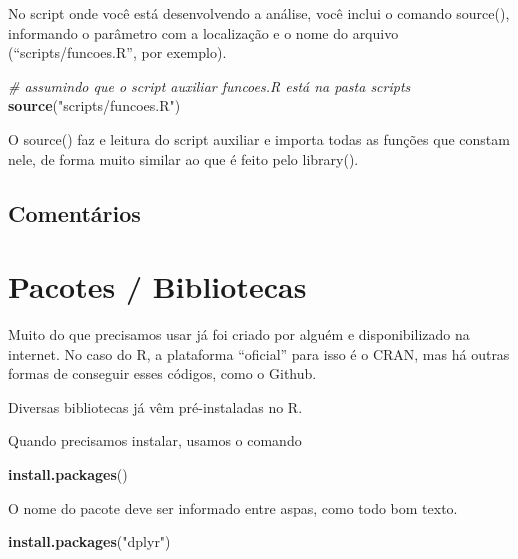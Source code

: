 \documentclass[
]{book}
\newenvironment{Shaded}{\begin{snugshade}}{\end{snugshade}}
\newcommand{\CommentTok}[1]{\textcolor[rgb]{0.56,0.35,0.01}{\textit{#1}}}
\newcommand{\KeywordTok}[1]{\textcolor[rgb]{0.13,0.29,0.53}{\textbf{#1}}}
\newcommand{\NormalTok}[1]{#1}
\newcommand{\StringTok}[1]{\textcolor[rgb]{0.31,0.60,0.02}{#1}}
\begin{document}
No script onde você está desenvolvendo a análise, você inclui o comando source(), informando o parâmetro com a localização e o nome do arquivo (``scripts/funcoes.R'', por exemplo).

\begin{Shaded}
\begin{Highlighting}[]
\CommentTok{# assumindo que o script auxiliar funcoes.R está na pasta scripts}
\KeywordTok{source}\NormalTok{(}\StringTok{"scripts/funcoes.R"}\NormalTok{)}
\end{Highlighting}
\end{Shaded}

O source() faz e leitura do script auxiliar e importa todas as funções que constam nele, de forma muito similar ao que é feito pelo library().

\hypertarget{comentuxe1rios}{%
\section{Comentários}\label{comentuxe1rios}}

\hypertarget{pacotes-bibliotecas}{%
\chapter{Pacotes / Bibliotecas}\label{pacotes-bibliotecas}}

Muito do que precisamos usar já foi criado por alguém e disponibilizado na internet. No caso do R, a plataforma ``oficial'' para isso é o CRAN, mas há outras formas de conseguir esses códigos, como o Github.

Diversas bibliotecas já vêm pré-instaladas no R.

Quando precisamos instalar, usamos o comando

\begin{Shaded}
\begin{Highlighting}[]
\KeywordTok{install.packages}\NormalTok{()}
\end{Highlighting}
\end{Shaded}

O nome do pacote deve ser informado entre aspas, como todo bom texto.

\begin{Shaded}
\begin{Highlighting}[]
\KeywordTok{install.packages}\NormalTok{(}\StringTok{"dplyr"}\NormalTok{)}
\end{Highlighting}
\end{Shaded}
\end{document}

